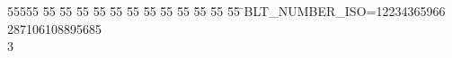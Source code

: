 %
%
\begin{tabbing}
55555 \= 55 \= 55 \= 55 \= 55 \= 55 \= 55 \= 55 \= 55 \= 55 \= 55 \= 55 \= 55 \= \>BLT\_NUMBER\_ISO=12234365966\\[0pt]
287106108895685\\[0pt]
3\>\end{tabbing}
